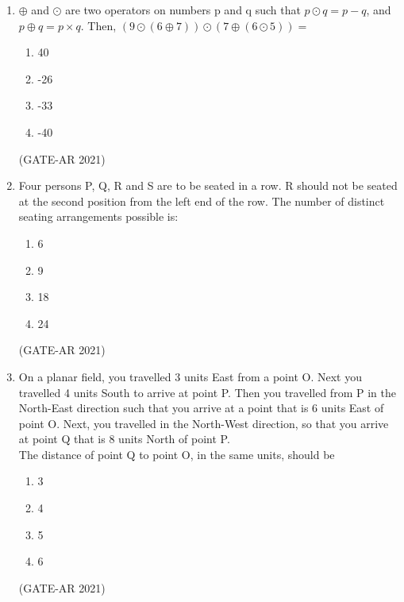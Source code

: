 \documentclass[a4paper,10pt]{article}
\begin{document}
\begin{enumerate}
    \item $\oplus$ and $\odot$ are two operators on numbers p and q such that $p \odot q = p - q$, and $p \oplus q = p \times q$. Then, $(9 \odot (6 \oplus 7)) \odot (7 \oplus (6 \odot 5)) =$
    \begin{multicols}{4}
    \begin{enumerate}
        \item 40
        \item -26
        \item -33
        \item -40
    \end{enumerate}
    \end{multicols}
    \hfill (GATE-AR 2021)

    \item Four persons P, Q, R and S are to be seated in a row. R should not be seated at the second position from the left end of the row. The number of distinct seating arrangements possible is:
    \begin{multicols}{4}
    \begin{enumerate}
        \item 6
        \item 9
        \item 18
        \item 24
    \end{enumerate}
    \end{multicols}
    \hfill (GATE-AR 2021)

    \item On a planar field, you travelled 3 units East from a point O. Next you travelled 4 units South to arrive at point P. Then you travelled from P in the North-East direction such that you arrive at a point that is 6 units East of point O. Next, you travelled in the North-West direction, so that you arrive at point Q that is 8 units North of point P. \\
    The distance of point Q to point O, in the same units, should be
    \begin{multicols}{4}
    \begin{enumerate}
        \item 3
        \item 4
        \item 5
        \item 6
    \end{enumerate}
    \end{multicols}
    \hfill (GATE-AR 2021)


\end{enumerate}
\end{document}
